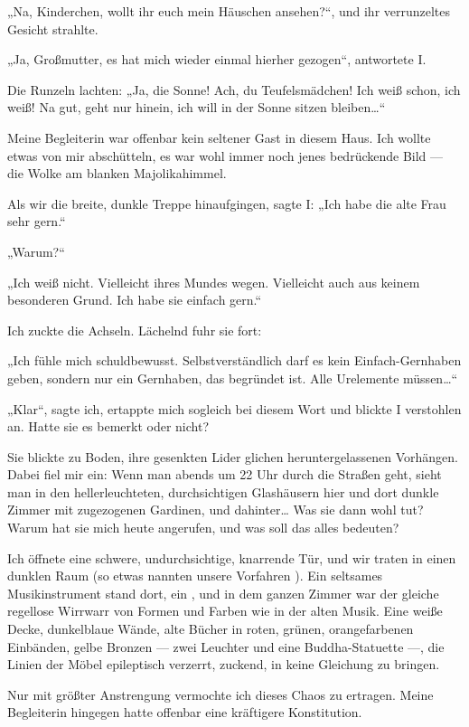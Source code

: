 „Na, Kinderchen, wollt ihr euch mein Häuschen ansehen?“, und ihr
verrunzeltes Gesicht strahlte.

„Ja, Großmutter, es hat mich wieder
einmal hierher gezogen“, antwortete I.

Die Runzeln lachten: „Ja, die Sonne! Ach, du Teufelsmädchen! Ich
weiß schon, ich weiß! Na gut, geht nur hinein, ich will in der
Sonne sitzen bleiben\ldots{}“

Meine Begleiterin war offenbar kein
seltener Gast in diesem Haus. Ich wollte etwas von mir abschütteln,
es war wohl immer noch jenes bedrückende Bild — die Wolke am
blanken Majolikahimmel.

Als wir die breite, dunkle Treppe hinaufgingen, sagte I: „Ich habe
die alte Frau sehr gern.“

„Warum?“

„Ich weiß nicht. Vielleicht ihres Mundes wegen. Vielleicht auch aus
keinem besonderen Grund. Ich habe sie einfach gern.“

Ich zuckte die Achseln. Lächelnd fuhr sie fort:

„Ich fühle mich
schuldbewusst. Selbstverständlich darf es kein
\glq{}Einfach-Gern\-ha\-ben\grq{} geben, sondern nur ein
Gernhaben, das begründet ist. Alle Urelemente müssen\ldots{}“

„Klar“,
sagte ich, ertappte mich sogleich bei diesem Wort und blickte I
verstohlen an. Hatte sie es bemerkt oder nicht?

Sie blickte zu Boden, ihre gesenkten Lider glichen
heruntergelassenen Vorhängen. Dabei fiel mir ein: Wenn man abends
um 22 Uhr durch die Straßen geht, sieht man in den
hellerleuchteten, durchsichtigen Glashäusern hier und dort dunkle
Zimmer mit zugezogenen Gardinen, und dahinter\ldots{} Was sie dann wohl
tut? Warum hat sie mich heute angerufen, und was soll das alles
bedeuten?

Ich öffnete eine schwere, undurchsichtige, knarrende Tür,
und wir traten in einen dunklen Raum (so etwas nannten
unsere Vorfahren ). Ein seltsames Musikinstrument stand
dort, ein , und in dem ganzen Zimmer war der gleiche
regellose Wirrwarr von Formen und Farben wie in der alten Musik.
Eine weiße Decke, dunkelblaue Wände, alte Bücher in roten, grünen,
orangefarbenen Einbänden, gelbe Bronzen — zwei Leuchter und eine
Buddha-Statuette —, die Linien der Möbel epileptisch verzerrt,
zuckend, in keine Gleichung zu bringen.

Nur mit größter Anstrengung
vermochte ich dieses Chaos zu ertragen. Meine Begleiterin hingegen
hatte offenbar eine kräftigere Konstitution.

